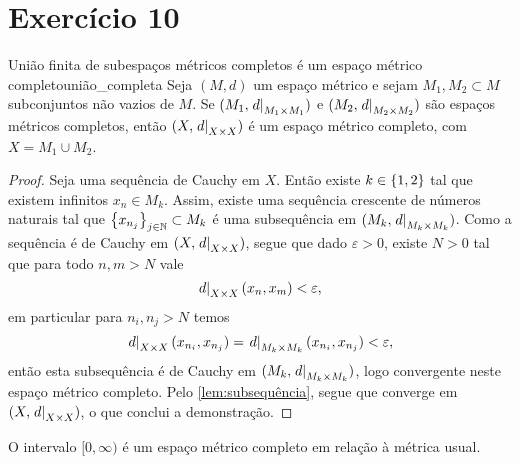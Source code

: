 \section*{Exercício 10}
\begin{lemma}{União finita de subespaços métricos completos é um espaço métrico completo}{união_completa}
    Seja \((M,d)\) um espaço métrico e sejam \(M_1, M_2 \subset M\) subconjuntos não vazios de \(M\). Se \((M_1, \left.d\right\rvert_{M_1\times M_1})\) e \((M_2, \left.d\right\rvert_{M_2\times M_2})\) são espaços métricos completos, então \((X, \left.d\right\rvert_{X\times X})\) é um espaço métrico completo, com \(X = M_1 \cup M_2\).
\end{lemma}
\begin{proof}
    Seja  uma sequência de Cauchy em \(X\). Então existe \(k \in \{1,2\}\) tal que existem infinitos \(x_n \in M_k\). Assim, existe uma sequência crescente  de números naturais tal que \(\left\{x_{n_j}\right\}_{j\in \mathbb{N}} \subset M_k\) é uma subsequência em \((M_k,\left.d\right\rvert_{M_k \times M_k})\). Como a sequência é de Cauchy em \((X, \left.d\right\rvert_{X\times X})\), segue que dado \(\varepsilon > 0\), existe \(N > 0\) tal que para todo \(n,m > N\) vale
    \begin{equation*}
        \left.d\right\rvert_{X\times X}(x_n, x_m) < \varepsilon,
    \end{equation*}
    em particular para \(n_i, n_j > N\) temos
    \begin{equation*}
        \left.d\right\rvert_{X\times X}(x_{n_i}, x_{n_j}) = \left.d\right\rvert_{M_k \times M_k}(x_{n_i}, x_{n_j}) < \varepsilon,
    \end{equation*}
    então esta subsequência é de Cauchy em \((M_k, \left.d\right\rvert_{M_k\times M_k})\), logo convergente neste espaço métrico completo. Pelo \cref{lem:subsequência}, segue que  converge em \((X, \left.d\right\rvert_{X\times X})\), o que conclui a demonstração.
\end{proof}
\begin{corollary}
    O intervalo \([0,\infty)\) é um espaço métrico completo em relação à métrica usual.
\end{corollary}

